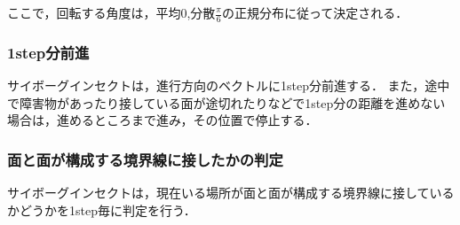 \documentclass[a4paper,11pt]{jarticle}
\begin{document}
	ここで，回転する角度は，平均0,分散$\frac{\pi}{6}$の正規分布に従って決定される．
	
	\subsubsection{1step分前進}
	サイボーグインセクトは，進行方向のベクトルに1step分前進する．
	また，途中で障害物があったり接している面が途切れたりなどで1step分の距離を進めない場合は，進めるところまで進み，その位置で停止する．
	
	\subsubsection{面と面が構成する境界線に接したかの判定}
	サイボーグインセクトは，現在いる場所が面と面が構成する境界線に接しているかどうかを1step毎に判定を行う．
	
\end{document}
